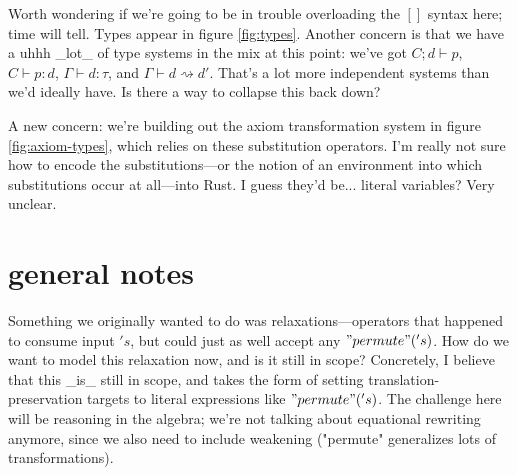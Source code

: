 \documentclass{article}
\begin{document}
Worth wondering if we're going to be in trouble overloading the $[]$ syntax here; time will tell. 
Types appear in figure \ref{fig:types}. 
Another concern is that we have a uhhh _lot_ of type systems in the mix at this point: 
we've got $C;d ⊢ p$, $C ⊢ p : d$, $Γ ⊢ d : τ$, and $Γ ⊢ d ⇝ d'$.  
That's a lot more independent systems than we'd ideally  have.  Is there a way to collapse this back down? 

A new concern: we're building out the axiom transformation system in figure \ref{fig:axiom-types}, which relies on these substitution operators. I'm really not sure how to encode the substitutions---or the notion of an environment into which substitutions occur at all---into Rust. I guess they'd be... literal variables? Very unclear.


\section{general notes}

Something we originally wanted to do was relaxations---operators that happened to consume input $'s$, but could just as well accept any $"permute"('s)$.  How do we want to model this relaxation now, and is it still in scope? Concretely, I believe that this _is_ still in scope, and takes the form of setting translation-preservation targets to literal expressions like $"permute"('s)$.  The challenge here will be reasoning in the algebra; we're not talking about equational rewriting anymore, since we also need to include weakening ("permute" generalizes lots of transformations). 
\end{document}
